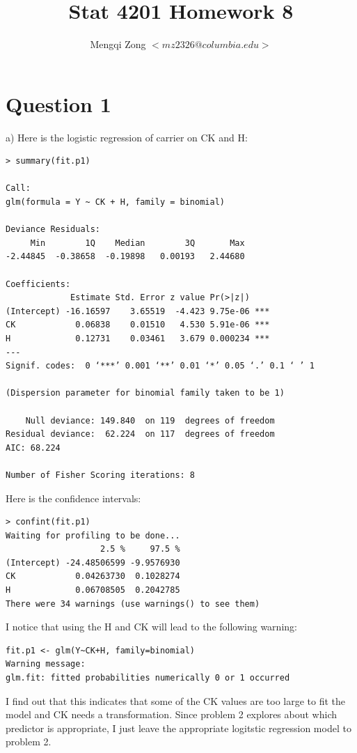 \documentclass[12pt]{article}
\title{Stat 4201 Homework 8}
\author{Mengqi Zong $<mz2326@columbia.edu>$}
\begin{document}
\maketitle

\setlength{\parindent}{0in}

\section*{Question 1}

a) Here is the logistic regression of carrier on CK and H:

\begin{verbatim}
> summary(fit.p1)

Call:
glm(formula = Y ~ CK + H, family = binomial)

Deviance Residuals: 
     Min        1Q    Median        3Q       Max  
-2.44845  -0.38658  -0.19898   0.00193   2.44680  

Coefficients:
             Estimate Std. Error z value Pr(>|z|)    
(Intercept) -16.16597    3.65519  -4.423 9.75e-06 ***
CK            0.06838    0.01510   4.530 5.91e-06 ***
H             0.12731    0.03461   3.679 0.000234 ***
---
Signif. codes:  0 ‘***’ 0.001 ‘**’ 0.01 ‘*’ 0.05 ‘.’ 0.1 ‘ ’ 1 

(Dispersion parameter for binomial family taken to be 1)

    Null deviance: 149.840  on 119  degrees of freedom
Residual deviance:  62.224  on 117  degrees of freedom
AIC: 68.224

Number of Fisher Scoring iterations: 8
\end{verbatim}

Here is the confidence intervals:

\begin{verbatim}
> confint(fit.p1) 
Waiting for profiling to be done...
                   2.5 %     97.5 %
(Intercept) -24.48506599 -9.9576930
CK            0.04263730  0.1028274
H             0.06708505  0.2042785
There were 34 warnings (use warnings() to see them)
\end{verbatim}

I notice that using the H and CK will lead to the following
warning: 

\begin{verbatim}
fit.p1 <- glm(Y~CK+H, family=binomial)
Warning message:
glm.fit: fitted probabilities numerically 0 or 1 occurred 
\end{verbatim}

I find out that this indicates that some of the CK values are too
large to fit the model and CK needs a transformation. Since problem 2
explores about which predictor is appropriate, I just leave the
appropriate logitstic regression model to problem 2. \\
\end{document}
